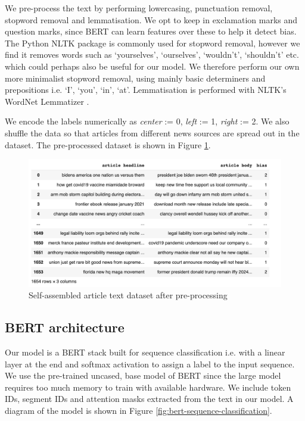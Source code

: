 We pre-process the text by performing lowercasing, punctuation removal, stopword removal and lemmatisation. We opt to keep in exclamation marks and question marks, since BERT can learn features over these to help it detect bias. The Python NLTK \cite{nltk} package is commonly used for stopword removal, however we find it removes words such as `yourselves', `ourselves', `wouldn't', `shouldn't' etc. which could perhaps also be useful for our model. We therefore perform our own more minimalist stopword removal, using mainly basic determiners and prepositions i.e. `I', `you', `in', `at'. Lemmatisation is performed with NLTK's WordNet Lemmatizer \cite{wordnet}.

We encode the labels numerically as \textit{center} := 0, \textit{left} := 1, \textit{right} := 2. We also shuffle the data so that articles from different news sources are spread out in the dataset. The pre-processed dataset is shown in Figure \ref{fig:nmr-bert-data-preprocessed}.

\begin{figure}
    \centering
    \includegraphics[scale=0.32]{0-img/nmr-bert-data-preprocessed.png}
    \caption{Self-assembled article text dataset after pre-processing}
    \label{fig:nmr-bert-data-preprocessed}
\end{figure}

\subsection{BERT architecture}

Our model is a BERT stack built for sequence classification i.e. with a linear layer at the end and softmax activation to assign a label to the input sequence. We use the pre-trained uncased, base model of BERT since the large model requires too much memory to train with available hardware. We include token IDs, segment IDs and attention masks extracted from the text in our model. A diagram of the model is shown in Figure \ref{fig:bert-sequence-classification}.

